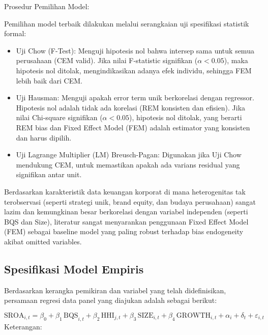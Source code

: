 \documentclass[12pt,a4paper]{report}
\providecommand{\tightlist}{%
  \setlength{\itemsep}{0pt}\setlength{\parskip}{0pt}%
}
\begin{document}
Prosedur Pemilihan Model:

Pemilihan model terbaik dilakukan melalui serangkaian uji spesifikasi
statistik formal:

\begin{itemize}
\tightlist
\item
  Uji Chow (F-Test): Menguji hipotesis nol bahwa intersep sama untuk
  semua perusahaan (CEM valid). Jika nilai F-statistic signifikan
  (\(\alpha < 0.05\)), maka hipotesis nol ditolak, mengindikasikan
  adanya efek individu, sehingga FEM lebih baik dari CEM.
\item
  Uji Hausman: Menguji apakah error term unik berkorelasi dengan
  regressor. Hipotesis nol adalah tidak ada korelasi (REM konsisten dan
  efisien). Jika nilai Chi-square signifikan (\(\alpha < 0.05\)),
  hipotesis nol ditolak, yang berarti REM bias dan Fixed Effect Model
  (FEM) adalah estimator yang konsisten dan harus dipilih.
\item
  Uji Lagrange Multiplier (LM) Breusch-Pagan: Digunakan jika Uji Chow
  mendukung CEM, untuk memastikan apakah ada varians residual yang
  signifikan antar unit.
\end{itemize}

Berdasarkan karakteristik data keuangan korporat di mana heterogenitas
tak terobservasi (seperti strategi unik, brand equity, dan budaya
perusahaan) sangat lazim dan kemungkinan besar berkorelasi dengan
variabel independen (seperti BQS dan Size), literatur sangat menyarankan
penggunaan Fixed Effect Model (FEM) sebagai baseline model yang paling
robust terhadap bias endogeneity akibat omitted variables.

\hypertarget{spesifikasi-model-empiris}{%
\subsection{Spesifikasi Model Empiris}\label{spesifikasi-model-empiris}}

Berdasarkan kerangka pemikiran dan variabel yang telah didefinisikan,
persamaan regresi data panel yang diajukan adalah sebagai berikut:

\[
\mathrm{SROA}_{i,t} = \beta_0 + \beta_1\,\mathrm{BQS}_{i,t} + \beta_2\,\mathrm{HHI}_{j,t} + \beta_3\,\mathrm{SIZE}_{i,t} + \beta_4\,\mathrm{GROWTH}_{i,t} + \alpha_i + \delta_t + \varepsilon_{i,t}
\] Keterangan:
\end{document}
